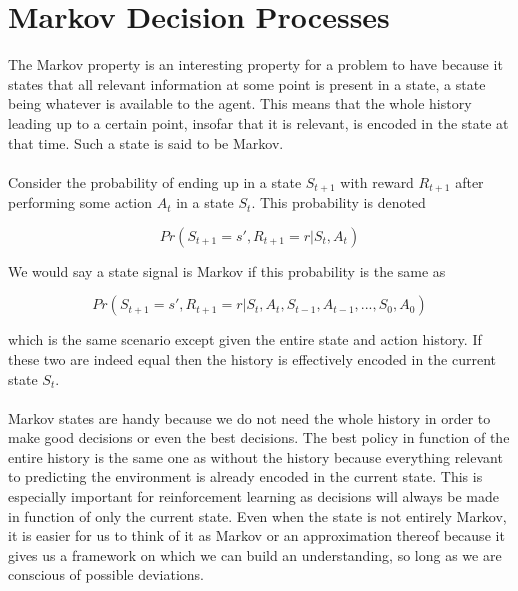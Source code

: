 \section{Markov Decision Processes}
The Markov property is an interesting property for a problem to have
because it states that all relevant information at some point
is present in a state, a state being whatever is available to the agent.
This means that the whole history leading up to a certain point,
insofar that it is relevant,
is encoded in the state at that time.
Such a state is said to be Markov.

\paragraph{}
Consider the probability of ending up in a state $S_{t+1}$
with reward $R_{t+1}$
after performing some action $A_t$
in a state $S_t$.
This probability is denoted

\begin{equation}
  Pr(S_{t+1}=s', R_{t+1}=r | S_t, A_t)
\end{equation}

We would say a state signal is Markov if this probability is the same as

\begin{equation}
  Pr(S_{t+1}=s', R_{t+1}=r | S_t, A_t, S_{t-1}, A_{t-1},..., S_0, A_0)
\end{equation}

which is the same scenario except given the entire state and action history.
If these two are indeed equal
then the history is effectively encoded in the current state $S_t$.

\paragraph{}
Markov states are handy because we do not need the whole history
in order to make good decisions or even the best decisions.
The best policy in function of the entire history
is the same one as without the history
because everything relevant to predicting the environment
is already encoded in the current state.
This is especially important for reinforcement learning
as decisions will always be made in function of only the current state.
Even when the state is not entirely Markov,
it is easier for us to think of it as Markov
or an approximation thereof
because it gives us a framework on which
we can build an understanding,
so long as we are conscious of possible deviations.

